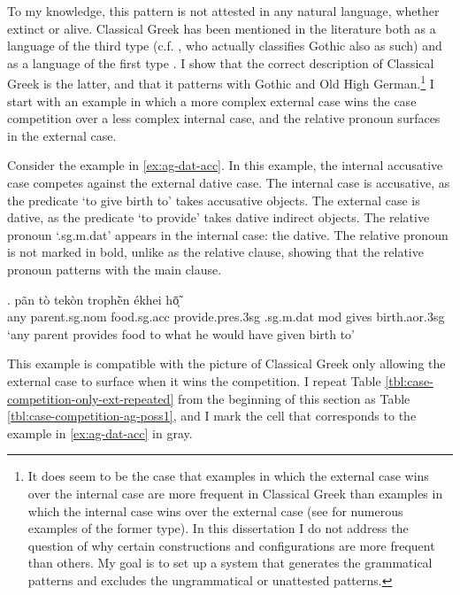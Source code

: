 To my knowledge, this pattern is not attested in any natural language, whether extinct or alive. Classical Greek has been mentioned in the literature both as a language of the third type (c.f. \citealt[120]{cinqueforthcoming}, who actually classifies Gothic also as such) and as a language of the first type \citep[cf.][41]{grosu1987}. I show that the correct description of Classical Greek is the latter, and that it patterns with Gothic and Old High German.\footnote{
It does seem to be the case that examples in which the external case wins over the internal case are more frequent in Classical Greek than examples in which the internal case wins over the external case (see \citealt{kakarikos2014} for numerous examples of the former type).
In this dissertation I do not address the question of why certain constructions and configurations are more frequent than others. My goal is to set up a system that generates the grammatical patterns and excludes the ungrammatical or unattested patterns.
}
I start with an example in which a more complex external case wins the case competition over a less complex internal case, and the relative pronoun surfaces in the external case.

Consider the example in \ref{ex:ag-dat-acc}. In this example, the internal accusative case competes against the external dative case.
The internal case is accusative, as the predicate  `to give birth to' takes accusative objects.
The external case is dative, as the predicate  `to provide' takes dative indirect objects.
The relative pronoun  `.\ac{sg}.\ac{m}.\ac{dat}' appears in the internal case: the dative. The relative pronoun is not marked in bold, unlike as the relative clause, showing that the relative pronoun patterns with the main clause.

\exg. pãn {tò tekòn} trophḕn ékhei hō̃ͅ  \\
any parent.\ac{sg}.\ac{nom} food.\ac{sg}.\ac{acc} provide.\ac{pres}.3\ac{sg}\scsub{[dat]} .\ac{sg}.\ac{m}.\ac{dat} \ac{mod} {gives birth}.\ac{aor}.3\ac{sg}\scsub{[acc]}\\
`any parent provides food to what he would have given birth to' \label{ex:ag-dat-acc}

This example is compatible with the picture of Classical Greek only allowing the external case to surface when it wins the competition. I repeat Table \ref{tbl:case-competition-only-ext-repeated} from the beginning of this section as Table \ref{tbl:case-competition-ag-poss1}, and I mark the cell that corresponds to the example in \ref{ex:ag-dat-acc} in gray.


